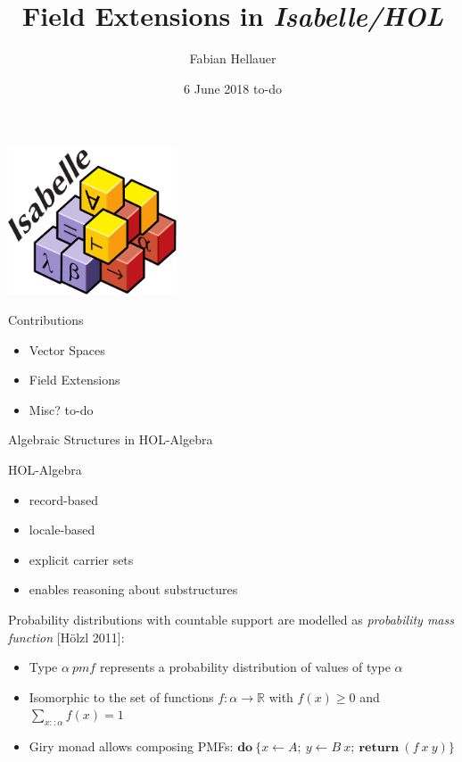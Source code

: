 \documentclass[%
	sans,
	12pt,
]{beamer}
\title{Field Extensions in \emph{Isabelle/HOL} \vspace*{-0.5em}}
\author{\normalsize Fabian Hellauer}
\institute[]{\footnotesize Technische Universität München}
\date{\footnotesize 6 June 2018 to-do}
\newcommand{\high}[1]{{\usebeamercolor[fg]{structure} #1}}
\begin{document}
\maketitle

\begin{frame}
\begin{center}
\includegraphics[width=5cm]{isabelle.pdf}
\end{center}
\end{frame}


\newcommand{\pivot}[1]{{\color{red}#1}}
\newcommand{\ltpiv}[1]{{\color{blue}#1}}
\newcommand{\gtpiv}[1]{{\color{olive}#1}}

\begin{frame}{Contributions}
\begin{itemize}
\item Vector Spaces\pause
\item Field Extensions\pause
\item Misc? to-do
\end{itemize}
\end{frame}

\begin{frame}
\begin{center}
\huge\high{Algebraic Structures in HOL-Algebra}
\end{center}
\end{frame}

\begin{frame}{HOL-Algebra}
\begin{itemize}
	\item record-based %
	\item locale-based %
	\item explicit carrier sets
	\item enables reasoning about substructures	%
\end{itemize}
\end{frame}

\begin{frame}
Probability distributions with countable support are modelled as \emph{probability mass function} [Hölzl 2011]:\pause
\begin{itemize}
\item Type $\alpha\ \textit{pmf}$ represents a probability distribution of values of type $\alpha$\pause
\item Isomorphic to the set of functions $f : \alpha\to\mathbb{R}$ with $f(x) \geq 0$ and $\sum_{x :: \alpha} f(x) = 1$\pause
\item Giry monad allows composing PMFs: $\textbf{do}\ \{x\leftarrow A;\ y \leftarrow B\ x;\ \textbf{return}\ (f\ x\ y)\}$
\end{itemize}
\end{frame}
\end{document}
